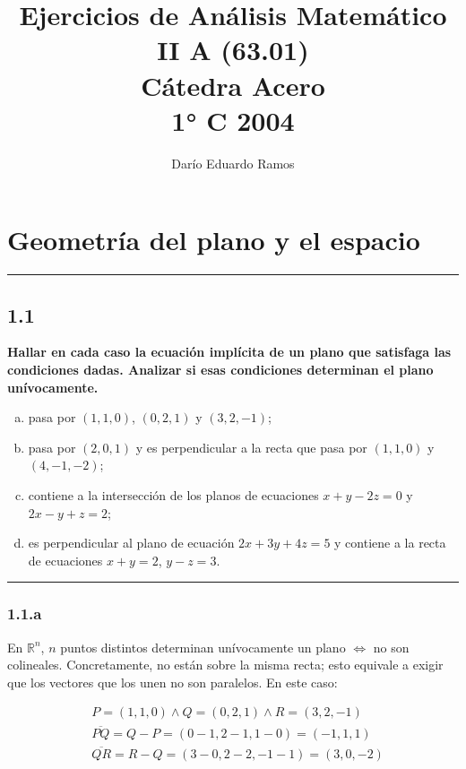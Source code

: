 \documentclass{article}
\title{Ejercicios de Análisis Matemático II A (63.01) \\ Cátedra Acero \\ 1° C 2004}
\author{Darío Eduardo Ramos}
\renewcommand{\Bbb}{\mathbb}
\begin{document}
\maketitle

\tableofcontents{}
\newpage

\section{Geometría del plano y el espacio}

\hrule
\vspace{10 pt}

\subsection*{1.1}
\label{subsec:1.1}

\textbf{Hallar en cada caso la ecuación implícita de un plano que satisfaga las condiciones dadas. Analizar si esas condiciones determinan el plano unívocamente.} 

\begin{enumerate}[(a)]
\bfseries
\item pasa por $(1, 1, 0)$, $(0, 2, 1)$ y $(3, 2, -1)$;

\item pasa por $(2, 0, 1)$ y es perpendicular a la recta que pasa por $(1, 1, 0)$ y $(4, -1, -2)$;

\item contiene a la intersección de los planos de ecuaciones $x + y - 2z = 0$ y $2x - y + z = 2$;

\item es perpendicular al plano de ecuación $2x + 3y + 4z = 5$ y contiene a la recta de ecuaciones $x + y = 2$, $y - z = 3$.
\end{enumerate}
\hrule

\subsubsection*{1.1.a}
\label{subsubsec:1.1.a}

En $\Bbb R^n$, $n$ puntos distintos determinan unívocamente un plano $\Leftrightarrow$ no son colineales. Concretamente, no están sobre la misma recta; esto equivale a exigir que los vectores que los unen no son paralelos. En este caso:

\begin{subequations}
\begin{align}
& P = (1, 1, 0) \wedge Q = (0, 2, 1) \wedge R = (3, 2, -1) \\
& \overline{PQ} = Q - P = (0-1, 2-1, 1-0) = (-1, 1, 1) \\
& \overline{QR} = R - Q = (3-0, 2-2, -1-1) = (3, 0, -2)
\end{align}
\end{subequations}
\end{document}
